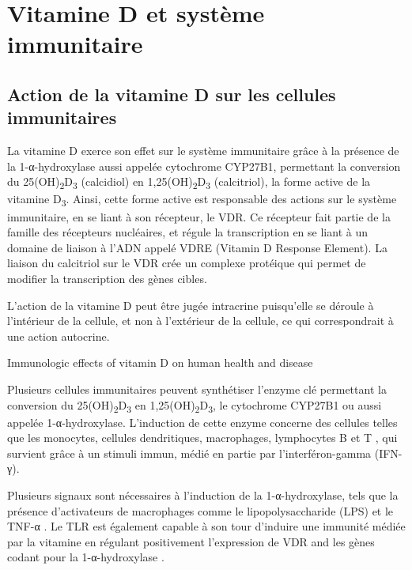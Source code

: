 \documentclass[
  a4paper,
  DIV=11,
  numbers=noendperiod,
  listof=totoc]{scrreprt}
\begin{document}
\newpage{}

\hypertarget{vitamine-d-et-systuxe8me-immunitaire}{%
\chapter{Vitamine D et système
immunitaire}\label{vitamine-d-et-systuxe8me-immunitaire}}

\hypertarget{action-de-la-vitamine-d-sur-les-cellules-immunitaires}{%
\section{Action de la vitamine D sur les cellules
immunitaires}\label{action-de-la-vitamine-d-sur-les-cellules-immunitaires}}

La vitamine D exerce son effet sur le système immunitaire grâce à la
présence de la 1-α-hydroxylase aussi appelée cytochrome CYP27B1,
permettant la conversion du 25(OH)\textsubscript{2}D\textsubscript{3}
(calcidiol) en 1,25(OH)\textsubscript{2}D\textsubscript{3} (calcitriol),
la forme active de la vitamine D\textsubscript{3}. Ainsi, cette forme
active est responsable des actions sur le système immunitaire, en se
liant à son récepteur, le VDR. Ce récepteur fait partie de la famille
des récepteurs nucléaires, et régule la transcription en se liant à un
domaine de liaison à l'ADN appelé VDRE (Vitamin D Response Element). La
liaison du calcitriol sur le VDR crée un complexe protéique qui permet
de modifier la transcription des gènes cibles.

L'action de la vitamine D peut être jugée intracrine puisqu'elle se
déroule à l'intérieur de la cellule, et non à l'extérieur de la cellule,
ce qui correspondrait à une action autocrine.

Immunologic effects of vitamin D on human health and disease

Plusieurs cellules immunitaires peuvent synthétiser l'enzyme clé
permettant la conversion du 25(OH)\textsubscript{2}D\textsubscript{3} en
1,25(OH)\textsubscript{2}D\textsubscript{3}, le cytochrome CYP27B1 ou
aussi appelée 1-α-hydroxylase. L'induction de cette enzyme concerne des
cellules telles que les monocytes, cellules dendritiques, macrophages,
lymphocytes B et T \autocite{Meza-Meza.2020,Dankers.2017}, qui survient
grâce à un stimuli immun, médié en partie par l'interféron-gamma
(IFN-γ).

Plusieurs signaux sont nécessaires à l'induction de la 1-α-hydroxylase,
tels que la présence d'activateurs de macrophages comme le
lipopolysaccharide (LPS) et le TNF-α \autocite{Overbergh.2006}. Le TLR
est également capable à son tour d'induire une immunité médiée par la
vitamine en régulant positivement l'expression de VDR and les gènes
codant pour la 1-α-hydroxylase \autocite{Liu.2006}.
\end{document}

